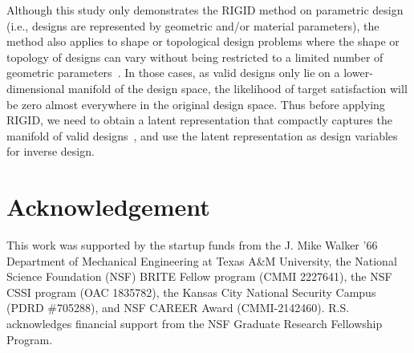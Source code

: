 \documentclass{article}
\begin{document}
Although this study only demonstrates the RIGID method on parametric design (i.e., designs are represented by geometric and/or material parameters), the method also applies to shape or topological design problems where the shape or topology of designs can vary without being restricted to a limited number of geometric parameters~\cite{liu2018generative,jiang2019free,ma2019probabilistic,wen2020robust,an2021multifunctional}. In those cases, as valid designs only lie on a lower-dimensional manifold of the design space, the likelihood of target satisfaction will be zero almost everywhere in the original design space. Thus before applying RIGID, we need to obtain a latent representation that compactly captures the manifold of valid designs~\cite{wang2020deep,chen2023gan}, and use the latent representation as design variables for inverse design.



\section*{Acknowledgement}

This work was supported by the startup funds from the J. Mike Walker '66 Department of Mechanical Engineering at Texas A\&M University, the National Science Foundation (NSF) BRITE Fellow program (CMMI 2227641), the NSF CSSI program (OAC 1835782), the Kansas City National Security Campus (PDRD \#705288), and NSF CAREER Award (CMMI-2142460). R.S. acknowledges financial support from the NSF Graduate Research Fellowship Program.





\end{document}
